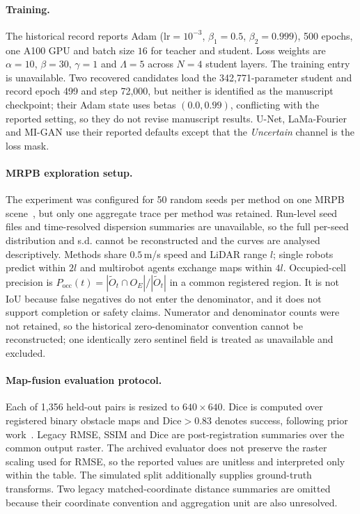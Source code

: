 \documentclass[11pt]{article}
\begin{document}
\paragraph{Training.} The historical record reports Adam ($\text{lr}{=}10^{-3}$, $\beta_1{=}0.5$, $\beta_2{=}0.999$), 500 epochs, one A100 GPU and batch size $16$ for teacher and student. Loss weights are $\alpha{=}10$, $\beta{=}30$, $\gamma{=}1$ and $\Lambda{=}5$ across $N{=}4$ student layers. The training entry is unavailable. Two recovered candidates load the 342{,}771-parameter student and record epoch 499 and step 72{,}000, but neither is identified as the manuscript checkpoint; their Adam state uses betas $(0.0,0.99)$, conflicting with the reported setting, so they do not revise manuscript results. U-Net, LaMa-Fourier and MI-GAN use their reported defaults except that the \emph{Uncertain} channel is the loss mask.

\paragraph{MRPB exploration setup.}
The experiment was configured for 50 random seeds per method on one MRPB scene~\citep{wen2021mrpb}, but only one aggregate trace per method was retained. Run-level seed files and time-resolved dispersion summaries are unavailable, so the full per-seed distribution and s.d. cannot be reconstructed and the curves are analysed descriptively. Methods share $0.5$\,m/s speed and LiDAR range $l$; single robots predict within $2l$ and multirobot agents exchange maps within $4l$. Occupied-cell precision is $P_{\mathrm{occ}}(t)=|\widetilde O_t\cap O_E|/|\widetilde O_t|$ in a common registered region. It is not IoU because false negatives do not enter the denominator, and it does not support completion or safety claims. Numerator and denominator counts were not retained, so the historical zero-denominator convention cannot be reconstructed; one identically zero sentinel field is treated as unavailable and excluded.

\paragraph{Map-fusion evaluation protocol.} \label{app:eval}
Each of 1{,}356 held-out pairs is resized to $640{\times}640$. Dice is computed over registered binary obstacle maps and Dice$>0.83$ denotes success, following prior work~\citep{ho2024mapex}. Legacy RMSE, SSIM and Dice are post-registration summaries over the common output raster. The archived evaluator does not preserve the raster scaling used for RMSE, so the reported values are unitless and interpreted only within the table. The simulated split additionally supplies ground-truth transforms. Two legacy matched-coordinate distance summaries are omitted because their coordinate convention and aggregation unit are also unresolved.
\end{document}

